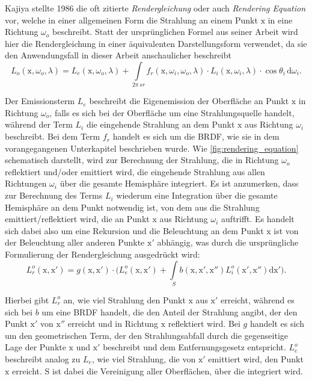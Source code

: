 \documentclass[thesis.tex]{subfiles}
\begin{document}
Kajiya stellte 1986 \cite{bib:Kajiya1986} die oft zitierte \emph{Rendergleichung} oder auch \emph{Rendering Equation} vor, welche in einer allgemeinen Form die Strahlung an einem Punkt $\mathrm{x}$ in eine Richtung $\omega_o$ beschreibt. Statt der ursprünglichen Formel aus seiner Arbeit wird hier die Rendergleichung in einer äquivalenten Darstellungsform verwendet, da sie den Anwendungsfall in dieser Arbeit anschaulicher beschreibt
\begin{equation}
L_o(\mathrm{x}, \omega_o, \lambda) = L_e(\mathrm{x}, \omega_o, \lambda) + \int\limits_{2\pi\,sr} f_r(\mathrm{x}, \omega_i, \omega_o, \lambda) \cdot L_i(\mathrm{x}, \omega_i, \lambda) \cdot \cos\theta_i \, \mathrm{d}\omega_i.
\end{equation}

Der Emissionsterm $L_e$ beschreibt die Eigenemission der Oberfläche an Punkt $\mathrm{x}$ in Richtung $\omega_o$, falls es sich bei der Oberfläche um eine Strahlungsquelle handelt, während der Term $L_i$ die eingehende Strahlung an dem Punkt $\mathrm{x}$ aus Richtung $\omega_i$ beschreibt. Bei dem Term $f_r$ handelt es sich um die BRDF, wie sie in dem vorangegangenen Unterkapitel beschrieben wurde. Wie \autoref{fig:rendering_equation} schematisch darstellt, wird zur  Berechnung der Strahlung, die in Richtung  $\omega_o$ reflektiert und/oder emittiert wird, die eingehende Strahlung aus allen Richtungen $\omega_i$ über die gesamte Hemisphäre integriert. Es ist anzumerken, dass zur Berechnung des Terms $L_i$ wiederum eine Integration über die gesamte Hemisphäre an dem Punkt notwendig ist, von dem aus die Strahlung emittiert/reflektiert wird, die an Punkt $\mathrm{x}$ aus Richtung $\omega_i$ auftrifft. Es handelt sich dabei also um eine Rekursion und die Beleuchtung an dem Punkt $\mathrm{x}$ ist von der Beleuchtung aller anderen Punkte $\mathrm{x}'$ abhängig, was durch die ursprüngliche Formulierung der Rendergleichung ausgedrückt wird:
\begin{equation}
L_r^o(\mathrm{x}, \mathrm{x}') = g(\mathrm{x}, \mathrm{x}') \cdot \Big( L_e^o(\mathrm{x}, \mathrm{x}')+\int\limits_{S} b(\mathrm{x}, \mathrm{x}', \mathrm{x}'')L_i^o(\mathrm{x}', \mathrm{x}'')\mathrm{d}\mathrm{x}'\Big).
\end{equation}

Hierbei gibt $L_r^o$ an, wie viel Strahlung den Punkt $\mathrm{x}$ aus $\mathrm{x}'$ erreicht, während es sich bei $b$ um eine BRDF handelt, die den Anteil der Strahlung angibt, der den Punkt $\mathrm{x}'$ von $\mathrm{x}''$ erreicht und in Richtung $\mathrm{x}$ reflektiert wird. Bei $g$ handelt es sich um den geometrischen Term, der den Strahlungsabfall durch die gegenseitige Lage der Punkte $\mathrm{x}$ und $\mathrm{x}'$ beschreibt und dem Entfernungsgesetz entspricht. $L_e^o$ beschreibt analog zu $L_e$, wie viel Strahlung, die von $\mathrm{x}'$ emittiert wird, den Punkt $\mathrm{x}$ erreicht. S ist dabei die Vereinigung aller Oberflächen, über die integriert wird.
\end{document}
